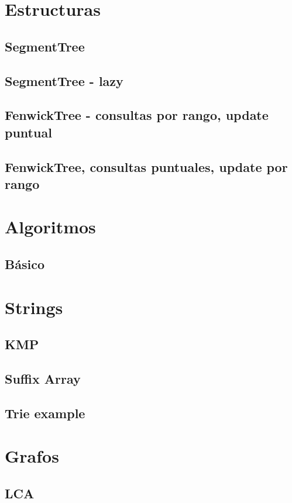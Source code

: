\documentclass[10pt,landscape,twocolumn,a4paper,notitlepage]{article}
\begin{document}
\def\title{Calce Team}
\tableofcontents\newpage

\section{Estructuras}
\subsection{SegmentTree}

\subsection{SegmentTree - lazy}

\subsection{FenwickTree - consultas por rango, update puntual}


\subsection{FenwickTree, consultas puntuales, update por rango}


\section{Algoritmos}
\subsection{Básico}


\section{Strings}
\subsection{KMP}

\subsection{Suffix Array}

\subsection{Trie example}




\section{Grafos}
\subsection{LCA}


\end{document}
